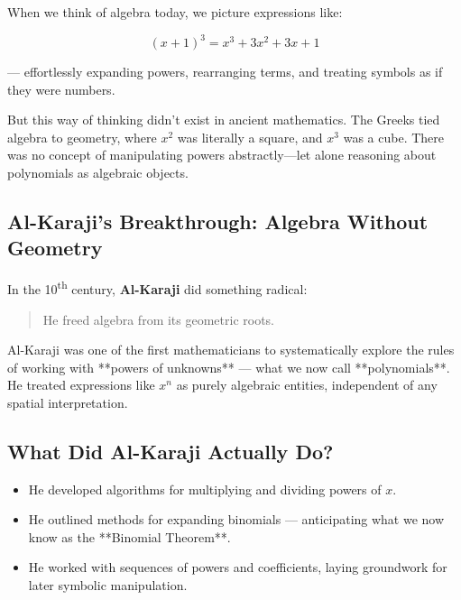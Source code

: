 \begin{tcolorbox}[colback=blue!5!white, colframe=blue!50!black, title={Historical Sidebar: Al-Karaji and the Birth of Polynomial Algebra}, breakable]

    When we think of algebra today, we picture expressions like:
    
    \[
    (x + 1)^3 = x^3 + 3x^2 + 3x + 1
    \]
    
    — effortlessly expanding powers, rearranging terms, and treating symbols as if they were numbers.
    
    But this way of thinking didn’t exist in ancient mathematics. The Greeks tied algebra to geometry, where \( x^2 \) was literally a square, and \( x^3 \) was a cube. There was no concept of manipulating powers abstractly—let alone reasoning about polynomials as algebraic objects.
    
    \subsection*{Al-Karaji’s Breakthrough: Algebra Without Geometry}
    
    In the 10\textsuperscript{th} century, \textbf{Al-Karaji} did something radical:
    
    \begin{quote}
    He freed algebra from its geometric roots.
    \end{quote}
    
    Al-Karaji was one of the first mathematicians to systematically explore the rules of working with **powers of unknowns** — what we now call **polynomials**. He treated expressions like \( x^n \) as purely algebraic entities, independent of any spatial interpretation.
    
    \subsection*{What Did Al-Karaji Actually Do?}
    
    \begin{itemize}
      \item He developed algorithms for multiplying and dividing powers of \( x \).
      \item He outlined methods for expanding binomials — anticipating what we now know as the **Binomial Theorem**.
      \item He worked with sequences of powers and coefficients, laying groundwork for later symbolic manipulation.
    \end{itemize}
    

\end{tcolorbox}
